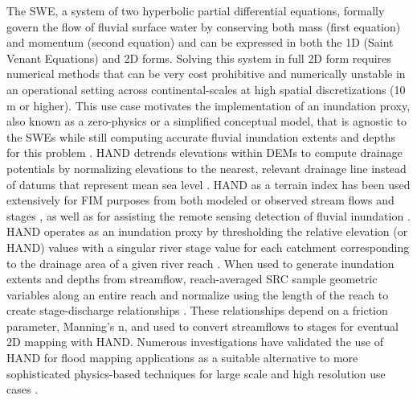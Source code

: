 \documentclass[preprint,review,12pt]{dependencies/elsarticle}
\begin{document}
The \ac{SWE}, a system of two hyperbolic partial differential equations, formally govern the flow of fluvial surface water by conserving both mass (first equation) and momentum (second equation) and can be expressed in both the \ac{1D} (Saint Venant Equations) and \ac{2D} forms.
Solving this system in full \ac{2D} form requires numerical methods that can be very cost prohibitive and numerically unstable in an operational setting across continental-scales at high spatial discretizations (10 \ac{m} or higher).
This use case motivates the implementation of an inundation proxy, also known as a zero-physics or a simplified conceptual model, that is agnostic to the \acp{SWE} while still computing accurate fluvial inundation extents and depths for this problem \citep{teng2015rapid,bates2000simple}.
\ac{HAND} detrends elevations within \acp{DEM} to compute drainage potentials by normalizing elevations to the nearest, relevant drainage line instead of datums that represent mean sea level \citep{renno2008hand,nobre2011height,nobre2016hand}.
\ac{HAND} as a terrain index has been used extensively for \ac{FIM} purposes from both modeled or observed stream flows and stages \citep{nobre2016hand,afshari2018comparison,garousi2019terrain,johnson2019integrated,zheng2018geoflood,zheng2018river,zhang2018comparative,teng2015rapid,li2022accounting,li2020evaluation}, as well as for assisting the remote sensing detection of fluvial inundation \citep{aristizabal2020high,shastry2019using,aristizabal2021mapping,huang2017comparison,twele2016sentinel}.
\ac{HAND} operates as an inundation proxy by thresholding the relative elevation (or \ac{HAND}) values with a singular river stage value for each catchment corresponding to the drainage area of a given river reach \citep{nobre2016hand,garousi2019terrain,johnson2019integrated,zheng2018geoflood,teng2015rapid,li2020evaluation,liu2016cybergis,maidment2017conceptual,liu2018cybergis,liu2020height,liu2018review}.
When used to generate inundation extents and depths from streamflow, reach-averaged \ac{SRC} sample geometric variables along an entire reach and normalize using the length of the reach to create stage-discharge relationships \citep{zheng2018river,aristizabal2022extending,godbout2019error}.
These relationships depend on a friction parameter, Manning's n, and used to convert streamflows to stages for eventual \ac{2D} mapping with \ac{HAND}.
Numerous investigations have validated the use of \ac{HAND} for flood mapping applications as a suitable alternative to more sophisticated physics-based techniques for large scale and high resolution use cases \citep{johnson2019integrated,li2020evaluation,li2022comparative,aristizabal2022extending,nobre2016hand,godbout2019error,afshari2018comparison,zhang2018comparative,teng2015rapid,teng2017flood,diehl2021improving,hocini2021performance,bates2003optimal}.
\end{document}
